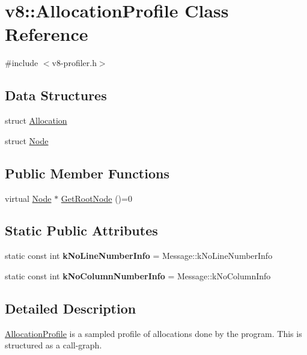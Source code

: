 \hypertarget{classv8_1_1AllocationProfile}{}\section{v8\+:\+:Allocation\+Profile Class Reference}
\label{classv8_1_1AllocationProfile}


{\ttfamily \#include $<$v8-\/profiler.\+h$>$}

\subsection*{Data Structures}
\begin{DoxyCompactItemize}
\item 
struct \mbox{\hyperlink{structv8_1_1AllocationProfile_1_1Allocation}{Allocation}}
\item 
struct \mbox{\hyperlink{structv8_1_1AllocationProfile_1_1Node}{Node}}
\end{DoxyCompactItemize}
\subsection*{Public Member Functions}
\begin{DoxyCompactItemize}
\item 
virtual \mbox{\hyperlink{structv8_1_1AllocationProfile_1_1Node}{Node}} $\ast$ \mbox{\hyperlink{classv8_1_1AllocationProfile_afea045dae30df5477088e2f0b7edb6c4}{Get\+Root\+Node}} ()=0
\end{DoxyCompactItemize}
\subsection*{Static Public Attributes}
\begin{DoxyCompactItemize}
\item 
\mbox{\label{classv8_1_1AllocationProfile_a26fdfe9e4846d26c83d0ad8c2ed2d783}} 
static const int {\bfseries k\+No\+Line\+Number\+Info} = Message\+::k\+No\+Line\+Number\+Info
\item 
\mbox{\label{classv8_1_1AllocationProfile_a9cfa103f73e82629694eee3734826eb7}} 
static const int {\bfseries k\+No\+Column\+Number\+Info} = Message\+::k\+No\+Column\+Info
\end{DoxyCompactItemize}


\subsection{Detailed Description}
\mbox{\hyperlink{classv8_1_1AllocationProfile}{Allocation\+Profile}} is a sampled profile of allocations done by the program. This is structured as a call-\/graph. 

